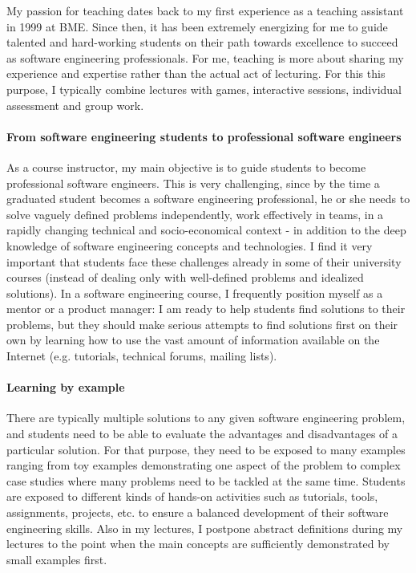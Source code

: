 \documentclass[a4paper,11pt]{report}
\begin{document}
My passion for teaching dates back to my first experience as a teaching assistant in 1999 at BME. Since then, it has been 
extremely energizing for me to guide talented and hard-working students on their path towards excellence to succeed as 
software engineering professionals. For me, teaching is more about sharing my experience and expertise rather than the 
actual act of lecturing. For this this purpose, I typically combine lectures with games, interactive sessions, individual 
assessment and group work. 

\paragraph{From software engineering students to professional software engineers}
As a course instructor, my main objective is to guide students to become professional software engineers. This is very 
challenging, since by the time a graduated student becomes a software engineering professional, he or she needs to solve 
vaguely defined problems independently, work effectively in teams, in a rapidly changing technical and socio-economical 
context - in addition to the deep knowledge of software engineering concepts and technologies. I find it very important that 
students face these challenges already in some of their university courses (instead of dealing only with well-defined 
problems and idealized solutions). In a software engineering course, I frequently position myself as a mentor or a product 
manager: I am ready to help students find solutions to their problems, but they should make serious attempts to find 
solutions first on their own by learning how to use the vast amount of information available on the Internet (e.g. tutorials, 
technical forums, mailing lists). 

\paragraph{Learning by example}
There are typically multiple solutions to any given software engineering problem, and students need to be able to evaluate 
the advantages and disadvantages of a particular solution. For that purpose, they need to be exposed to many examples 
ranging from toy examples demonstrating one aspect of the problem to complex case studies where many problems need to 
be tackled at the same time. Students are exposed to different kinds of hands-on activities such as tutorials, tools, 
assignments, projects, etc. to ensure a balanced development of their software engineering skills. Also in my lectures, I 
postpone abstract definitions during my lectures to the point when the main concepts are sufficiently demonstrated by small 
examples first.
\end{document}
